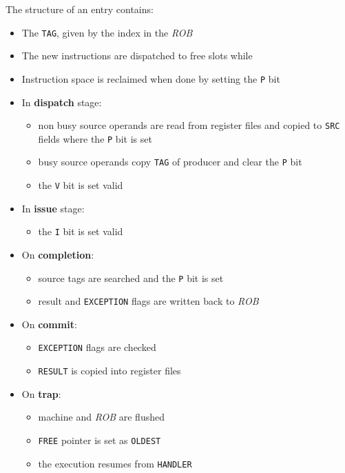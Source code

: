 \documentclass[english]{article}
\begin{document}
\begin{minipage}{\textwidth}
  \bigskip
  The structure of an entry contains:

  \begin{itemize}
    \item The \texttt{TAG}, given by the index in the \textit{ROB}
    \item The new instructions are dispatched to free slots while
    \item Instruction space is reclaimed when done by setting the \texttt{P} bit
    \item In \textbf{dispatch} stage:
          \begin{itemize}
            \item non busy source operands are read from register files and copied to \texttt{SRC} fields where the \texttt{P} bit is set
            \item busy source operands copy \texttt{TAG} of producer and clear the \texttt{P} bit
            \item the \texttt{V} bit is set valid
          \end{itemize}
    \item In \textbf{issue} stage:
          \begin{itemize}
            \item the \texttt{I} bit is set valid
          \end{itemize}
    \item On \textbf{completion}:
          \begin{itemize}
            \item source tags are searched and the \texttt{P} bit is set
            \item result and \texttt{EXCEPTION} flags are written back to \textit{ROB}
          \end{itemize}
    \item On \textbf{commit}:
          \begin{itemize}
            \item \texttt{EXCEPTION} flags are checked
            \item \texttt{RESULT} is copied into register files
          \end{itemize}
    \item On \textbf{trap}:
          \begin{itemize}
            \item machine and \textit{ROB} are flushed
            \item \texttt{FREE} pointer is set as \texttt{OLDEST}
            \item the execution resumes from \texttt{HANDLER}
          \end{itemize}
  \end{itemize}
\end{minipage}
\end{document}
